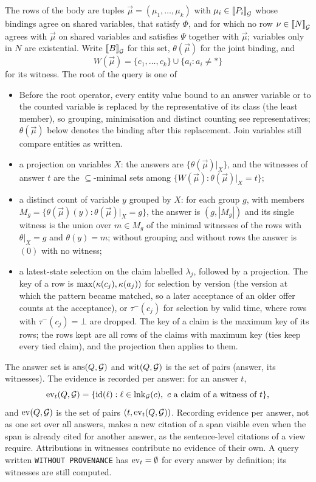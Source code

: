 The rows of the body are tuples $\vec\mu=(\mu_1,\dots,\mu_k)$ with $\mu_i\in[\![P_i]\!]_{\mathcal G}^{}$
whose bindings agree on shared variables, that satisfy $\Phi$, and for which no row
$\nu\in[\![N]\!]_{\mathcal G}^{}$ agrees with $\vec\mu$ on shared variables and satisfies $\Psi$ together
with $\vec\mu$; variables only in $N$ are existential. Write $[\![B]\!]_{\mathcal G}^{}$ for this set,
$\theta(\vec\mu)$ for the joint binding, and
\[
W(\vec\mu)=\{c_1,\dots,c_k\}\cup\{a_i:a_i\neq\ast\}
\]
for its witness. The root of the query is one of
\begin{itemize}
\item[] Before the root operator, every entity value bound to an answer variable or to the counted
  variable is replaced by the representative of its class (the least member), so grouping,
  minimisation and distinct counting see representatives; $\theta(\vec\mu)$ below denotes the
  binding after this replacement. Join variables still compare entities as written.
\item a projection on variables $X$: the answers are $\{\theta(\vec\mu)|_X\}$, and the witnesses
  of answer $t$ are the $\subseteq$-minimal sets among $\{W(\vec\mu):\theta(\vec\mu)|_X=t\}$;
\item a distinct count of variable $y$ grouped by $X$: for each group $g$, with members
  $M_g=\{\theta(\vec\mu)(y):\theta(\vec\mu)|_X=g\}$, the answer is $(g,|M_g|)$ and its single
  witness is the union over $m\in M_g$ of the minimal witnesses of the rows with
  $\theta|_X=g$ and $\theta(y)=m$; without grouping and without rows the answer is $(0)$ with no
  witness;
\item a latest-state selection on the claim labelled $\lambda_j$, followed by a projection. The
  key of a row is $\max(\kappa(c_j),\kappa(a_j))$ for selection by version (the version at which the
  pattern became matched, so a later acceptance of an older offer counts at the acceptance), or
  $\tau^-(c_j)$ for selection by valid time, where rows with $\tau^-(c_j)=\bot$ are dropped. The
  key of a claim is the maximum key of its rows; the rows kept are all rows of the claims with
  maximum key (ties keep every tied claim), and the projection then applies to them.
\end{itemize}
The answer set is
$\mathrm{ans}(Q,\mathcal G)$ and $\mathrm{wit}(Q,\mathcal G)$ is the set of pairs (answer, its witnesses). The evidence is recorded per answer: for an answer $t$,
\[
\ev_t(\Q,\G)=\{\mathrm{id}(\ell):\ell\in\evs_\G(c),\ c\text{ a claim of a witness of }t\},
\]
and $\mathrm{ev}(Q,\mathcal G)$ is the set of pairs $(t,\mathrm{ev}_t(Q,\mathcal G))$. Recording evidence per answer, not as
one set over all answers, makes a new citation of a span visible even when the span is already
cited for another answer, as the sentence-level citations of a view require.
Attributions in witnesses contribute no evidence of their own. A query written
\texttt{WITHOUT PROVENANCE} has $\mathrm{ev}_t=\emptyset$ for every answer by definition; its witnesses are still computed.


